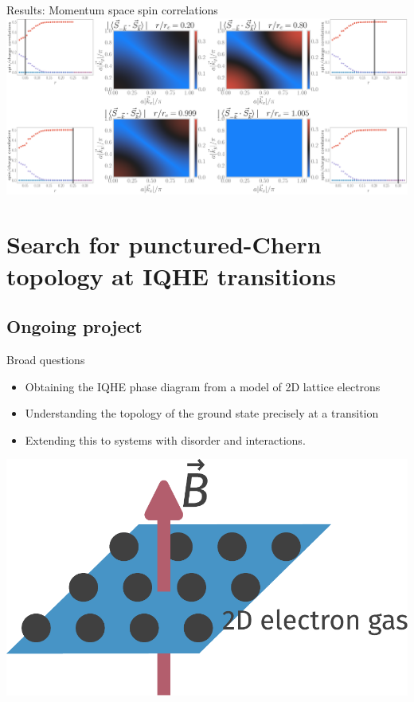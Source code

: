 \documentclass[aspectratio=169,t]{beamer}
\begin{document}
\begin{frame}{Results: Momentum space spin correlations}
\hspace*{-22pt}
\includegraphics[width=1.1\textwidth]{kspace_corr.pdf}
\end{frame}

\section{Search for punctured-Chern topology at IQHE transitions}
\subsection{Ongoing project}

\begin{frame}{Broad questions}

\vspace*{\fill}
\begin{minipage}{0.5\textwidth}
\begin{itemize}[<+->]
	\item Obtaining the \alert{IQHE phase diagram} from a model of 2D lattice electrons\\[10pt]
	\item Understanding the \alert{topology} of the ground state precisely at a transition\\[10pt]
	\item Extending this to systems with \alert{disorder} and interactions.
\end{itemize}
\end{minipage}
\hspace*{\fill}
\begin{minipage}{0.4\textwidth}
\includegraphics[width=\textwidth]{IQHE.pdf}
\end{minipage}

\vspace*{\fill}
\end{frame}
\end{document}
